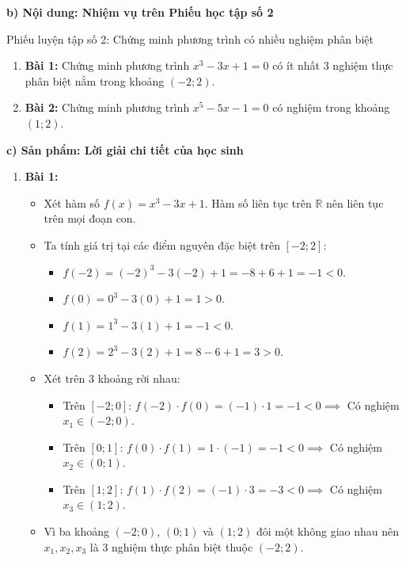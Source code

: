 \documentclass[12pt, a4paper]{article}
\begin{document}
\noindent \textbf{b) Nội dung: Nhiệm vụ trên Phiếu học tập số 2}
\begin{pedabox}{Phiếu luyện tập số 2: Chứng minh phương trình có nhiều nghiệm phân biệt}
\begin{enumerate}[leftmargin=0.6cm]
    \item \textbf{Bài 1:} Chứng minh phương trình $x^3 - 3x + 1 = 0$ có ít nhất 3 nghiệm thực phân biệt nằm trong khoảng $(-2; 2)$.
    \item \textbf{Bài 2:} Chứng minh phương trình $x^5 - 5x - 1 = 0$ có nghiệm trong khoảng $(1; 2)$.
\end{enumerate}
\end{pedabox}

\noindent \textbf{c) Sản phẩm: Lời giải chi tiết của học sinh}
\begin{enumerate}[leftmargin=0.6cm]
    \item \textbf{Bài 1:}
    \begin{itemize}
        \item Xét hàm số $f(x) = x^3 - 3x + 1$. Hàm số liên tục trên $\mathbb{R}$ nên liên tục trên mọi đoạn con.
        \item Ta tính giá trị tại các điểm nguyên đặc biệt trên $[-2; 2]$:
        \begin{itemize}
            \item $f(-2) = (-2)^3 - 3(-2) + 1 = -8 + 6 + 1 = -1 < 0$.
            \item $f(0) = 0^3 - 3(0) + 1 = 1 > 0$.
            \item $f(1) = 1^3 - 3(1) + 1 = -1 < 0$.
            \item $f(2) = 2^3 - 3(2) + 1 = 8 - 6 + 1 = 3 > 0$.
        \end{itemize}
        \item Xét trên 3 khoảng rời nhau:
        \begin{itemize}
            \item Trên $[-2; 0]$: $f(-2) \cdot f(0) = (-1) \cdot 1 = -1 < 0 \implies$ Có nghiệm $x_1 \in (-2; 0)$.
            \item Trên $[0; 1]$: $f(0) \cdot f(1) = 1 \cdot (-1) = -1 < 0 \implies$ Có nghiệm $x_2 \in (0; 1)$.
            \item Trên $[1; 2]$: $f(1) \cdot f(2) = (-1) \cdot 3 = -3 < 0 \implies$ Có nghiệm $x_3 \in (1; 2)$.
        \end{itemize}
        \item Vì ba khoảng $(-2; 0)$, $(0; 1)$ và $(1; 2)$ đôi một không giao nhau nên $x_1, x_2, x_3$ là 3 nghiệm thực phân biệt thuộc $(-2; 2)$.

\end{itemize}
\end{enumerate}
\end{document}

